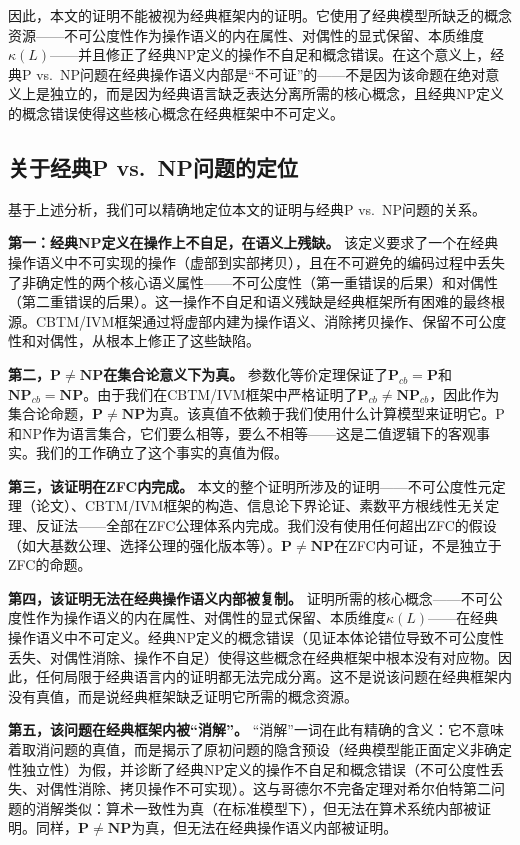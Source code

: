 \documentclass{ctexart}
\begin{document}
	因此，本文的证明不能被视为经典框架内的证明。它使用了经典模型所缺乏的概念资源——不可公度性作为操作语义的内在属性、对偶性的显式保留、本质维度$\kappa(L)$——并且修正了经典NP定义的操作不自足和概念错误。在这个意义上，经典P vs.\ NP问题在经典操作语义内部是``不可证''的——不是因为该命题在绝对意义上是独立的，而是因为经典语言缺乏表达分离所需的核心概念，且经典NP定义的概念错误使得这些核心概念在经典框架中不可定义。
	
	\subsection{关于经典P vs.\ NP问题的定位}
	
	基于上述分析，我们可以精确地定位本文的证明与经典P vs.\ NP问题的关系。
	
	\textbf{第一：经典NP定义在操作上不自足，在语义上残缺。} 该定义要求了一个在经典操作语义中不可实现的操作（虚部到实部拷贝），且在不可避免的编码过程中丢失了非确定性的两个核心语义属性——不可公度性（第一重错误的后果）和对偶性（第二重错误的后果）。这一操作不自足和语义残缺是经典框架所有困难的最终根源。CBTM/IVM框架通过将虚部内建为操作语义、消除拷贝操作、保留不可公度性和对偶性，从根本上修正了这些缺陷。
	
	\textbf{第二，$\mathbf{P} \neq \mathbf{NP}$在集合论意义下为真。} 参数化等价定理保证了$\mathbf{P}_{cb} = \mathbf{P}$和$\mathbf{NP}_{cb} = \mathbf{NP}$。由于我们在CBTM/IVM框架中严格证明了$\mathbf{P}_{cb} \neq \mathbf{NP}_{cb}$，因此作为集合论命题，$\mathbf{P} \neq \mathbf{NP}$为真。该真值不依赖于我们使用什么计算模型来证明它。P和NP作为语言集合，它们要么相等，要么不相等——这是二值逻辑下的客观事实。我们的工作确立了这个事实的真值为假。
	
	\textbf{第三，该证明在ZFC内完成。} 本文的整个证明所涉及的证明——不可公度性元定理（论文\cite{models2026}）、CBTM/IVM框架的构造、信息论下界论证、素数平方根线性无关定理、反证法——全部在ZFC公理体系内完成。我们没有使用任何超出ZFC的假设（如大基数公理、选择公理的强化版本等）。$\mathbf{P} \neq \mathbf{NP}$在ZFC内可证，不是独立于ZFC的命题。
	
	\textbf{第四，该证明无法在经典操作语义内部被复制。} 证明所需的核心概念——不可公度性作为操作语义的内在属性、对偶性的显式保留、本质维度$\kappa(L)$——在经典操作语义中不可定义。经典NP定义的概念错误（见证本体论错位导致不可公度性丢失、对偶性消除、操作不自足）使得这些概念在经典框架中根本没有对应物。因此，任何局限于经典语言内的证明都无法完成分离。这不是说该问题在经典框架内没有真值，而是说经典框架缺乏证明它所需的概念资源。
	
	\textbf{第五，该问题在经典框架内被``消解''。} ``消解''一词在此有精确的含义：它不意味着取消问题的真值，而是揭示了原初问题的隐含预设（经典模型能正面定义非确定性独立性）为假，并诊断了经典NP定义的操作不自足和概念错误（不可公度性丢失、对偶性消除、拷贝操作不可实现）。这与哥德尔不完备定理对希尔伯特第二问题的消解类似：算术一致性为真（在标准模型下），但无法在算术系统内部被证明。同样，$\mathbf{P} \neq \mathbf{NP}$为真，但无法在经典操作语义内部被证明。
	
\end{document}
